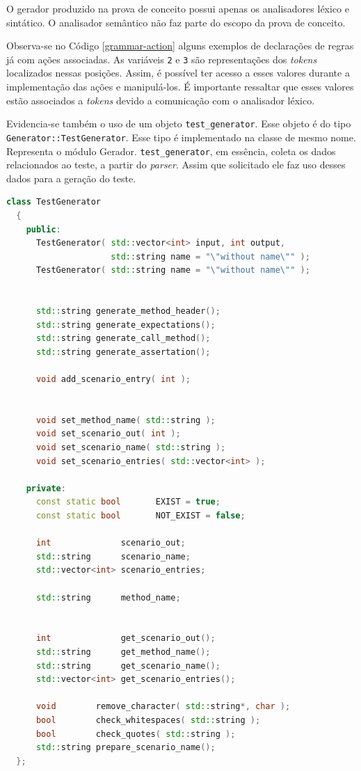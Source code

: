 \par
\indent O gerador produzido na prova de conceito possui apenas os analisadores
léxico e sintático. O analisador semântico não faz parte do escopo da prova de conceito.
\par
\indent Observa-se no Código \ref{grammar-action} alguns exemplos de declarações de
regras já com ações associadas. As variáveis \textdollar\lstinline|2| e
\textdollar\lstinline|3| são representações dos \textit{tokens} localizados nessas
posições. Assim, é possível ter acesso a esses valores durante a implementação das
ações e manipulá-los. É importante ressaltar que esses valores estão associados a
\textit{tokens} devido a comunicação com o analisador léxico.
\par
\indent Evidencia-se também o uso de um objeto \lstinline|test_generator|.
Esse objeto é do tipo \lstinline|Generator::TestGenerator|. Esse tipo é
implementado na classe de mesmo nome. Representa o módulo Gerador.
\lstinline|test_generator|, em essência, coleta os dados relacionados ao teste,
a partir do \textit{parser}. Assim que solicitado ele faz uso desses dados para
a geração do teste.
\begin{lstlisting}[language=C++, label=testgeneratorhpp, caption=Interface (\textit{header}) da classe TestGenerator]
  class TestGenerator
  {
    public:
      TestGenerator( std::vector<int> input, int output,
                     std::string name = "\"without name\"" );
      TestGenerator( std::string name = "\"without name\"" );


      std::string generate_method_header();
      std::string generate_expectations();
      std::string generate_call_method();
      std::string generate_assertation();

      void add_scenario_entry( int );


      void set_method_name( std::string );
      void set_scenario_out( int );
      void set_scenario_name( std::string );
      void set_scenario_entries( std::vector<int> );

    private:
      const static bool       EXIST = true;
      const static bool       NOT_EXIST = false;

      int              scenario_out;
      std::string      scenario_name;
      std::vector<int> scenario_entries;

      std::string      method_name;


      int              get_scenario_out();
      std::string      get_method_name();
      std::string      get_scenario_name();
      std::vector<int> get_scenario_entries();

      void        remove_character( std::string*, char );
      bool        check_whitespaces( std::string );
      bool        check_quotes( std::string );
      std::string prepare_scenario_name();
  };
\end{lstlisting}
